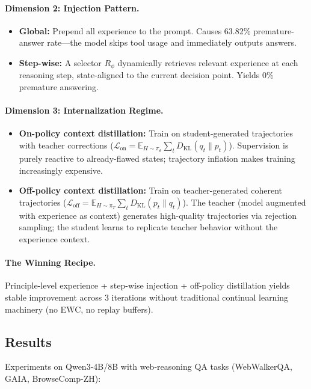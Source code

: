 \documentclass[11pt,a4paper]{article}
\begin{document}
\paragraph{Dimension 2: Injection Pattern.}
\begin{itemize}
\item \textbf{Global:} Prepend all experience to the prompt. Causes 63.82\% premature-answer rate---the model skips tool usage and immediately outputs answers.
\item \textbf{Step-wise:} A selector $R_\phi$ dynamically retrieves relevant experience at each reasoning step, state-aligned to the current decision point. Yields 0\% premature answering.
\end{itemize}

\paragraph{Dimension 3: Internalization Regime.}
\begin{itemize}
\item \textbf{On-policy context distillation:} Train on student-generated trajectories with teacher corrections ($\mathcal{L}_{\mathrm{on}} = \mathbb{E}_{H \sim \pi_\theta}\sum_t D_{\mathrm{KL}}(q_t \| p_t)$). Supervision is purely reactive to already-flawed states; trajectory inflation makes training increasingly expensive.
\item \textbf{Off-policy context distillation:} Train on teacher-generated coherent trajectories ($\mathcal{L}_{\mathrm{off}} = \mathbb{E}_{H \sim \pi_T}\sum_t D_{\mathrm{KL}}(p_t \| q_t)$). The teacher (model augmented with experience as context) generates high-quality trajectories via rejection sampling; the student learns to replicate teacher behavior without the experience context.
\end{itemize}

\paragraph{The Winning Recipe.} Principle-level experience + step-wise injection + off-policy distillation yields stable improvement across 3 iterations without traditional continual learning machinery (no EWC, no replay buffers).

\subsection{Results}

Experiments on Qwen3-4B/8B with web-reasoning QA tasks (WebWalkerQA, GAIA, BrowseComp-ZH):
\end{document}
